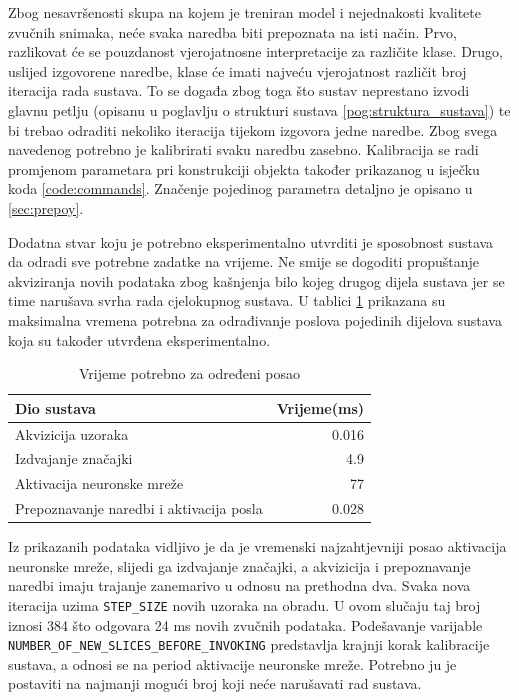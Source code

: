 Zbog nesavršenosti skupa na kojem je treniran model i nejednakosti kvalitete
zvučnih snimaka, neće svaka naredba biti prepoznata na isti način. Prvo, razlikovat će
se pouzdanost vjerojatnosne interpretacije za različite klase. Drugo, uslijed izgovorene
naredbe, klase će imati najveću vjerojatnost različit broj iteracija rada sustava.
To se događa zbog toga što sustav neprestano izvodi glavnu petlju (opisanu u poglavlju
o strukturi sustava \ref{pog:struktura_sustava}) te bi trebao odraditi nekoliko iteracija tijekom izgovora
jedne naredbe. Zbog svega navedenog potrebno je kalibrirati svaku naredbu zasebno.
Kalibracija se radi promjenom parametara pri konstrukciji objekta također prikazanog 
u isječku koda \ref{code:commands}. Značenje pojedinog  parametra detaljno je opisano u 
\ref{sec:prepoy}. 

Dodatna stvar koju je potrebno eksperimentalno utvrditi je sposobnost sustava da
odradi sve potrebne zadatke na vrijeme. Ne smije se dogoditi propuštanje akviziranja
novih podataka zbog kašnjenja bilo kojeg drugog dijela sustava jer se time narušava
svrha rada cjelokupnog sustava. U tablici \ref{tab:rts} prikazana su maksimalna
vremena potrebna za odrađivanje poslova pojedinih dijelova sustava koja su također
utvrđena eksperimentalno. 

\begin{table}[htb]
    \centering
    \begin{tabular}{|l|r|}
        \hline
        \textbf{Dio sustava} & \textbf{Vrijeme(ms)} \\ \hline
        Akvizicija uzoraka & 0.016\\ \hline
        Izdvajanje značajki & 4.9 \\ \hline
        Aktivacija neuronske mreže & 77 \\ \hline
        Prepoznavanje naredbi i aktivacija posla & 0.028 \\ \hline
    \end{tabular}
    \caption{Vrijeme potrebno za određeni posao}
    \label{tab:rts}
\end{table}

Iz prikazanih podataka
vidljivo je da je vremenski najzahtjevniji posao aktivacija neuronske mreže, slijedi ga 
izdvajanje značajki, a akvizicija i prepoznavanje naredbi imaju trajanje zanemarivo u odnosu
na prethodna dva. Svaka nova iteracija uzima \texttt{STEP\_SIZE} novih uzoraka na obradu. U ovom slučaju
taj broj iznosi 384 što odgovara 24 ms novih zvučnih podataka. Podešavanje varijable
\texttt{NUMBER\_OF\_NEW\_SLICES\_BEFORE\_INVOKING} predstavlja krajnji korak kalibracije sustava, a odnosi
se na period aktivacije neuronske mreže.
Potrebno ju je postaviti na najmanji mogući broj koji neće narušavati rad sustava. 

